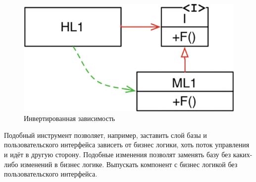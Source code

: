 \begin{figure}[h]
	\centering
	\includegraphics{inc/img/inverted.jpeg}
	\caption{Инвертированная зависимость}
	\label{img:inverted}
\end{figure}

Подобный инструмент позволяет, например, заставить слой базы и пользовательского интерфейса зависеть от бизнес логики, хоть поток управления и идёт в другую сторону. Подобные изменения позволят заменять базу без каких-либо изменений в бизнес логике. Выпускать компонент с бизнес логикой без пользовательского интерфейса.
